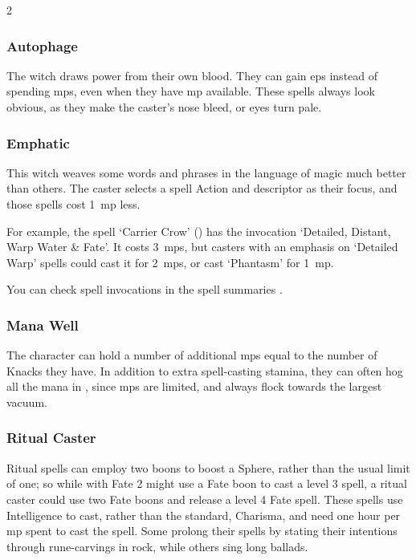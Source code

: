\begin{multicols}{2}

\subsubsection{Autophage}

The \gls{witch} draws power from their own blood.
They can gain \glspl{ep} instead of spending \glspl{mp}, even when they have \gls{mp} available.
These spells always look obvious, as they make the caster's nose bleed, or eyes turn pale.

\subsubsection{Emphatic}
\label{emphaticCaster}

This \gls{witch} weaves some words and phrases in the language of magic much better than others.
The caster selects a spell Action and \gls{descriptor} as their focus, and those spells cost 1~\gls{mp} less.

For example, the spell `Carrier Crow' () has the invocation `Detailed, Distant, Warp Water \& Fate'.
It costs 3~\glspl{mp}, but casters with an emphasis on `Detailed Warp' spells could cast it for 2~\glspl{mp}, or cast `Phantasm' for 1~\gls{mp}.

You can check spell \glspl{invocation} in the spell summaries .

\subsubsection{Mana Well}
\label{manaWell}

The character can hold a number of additional \glspl{mp} equal to the number of Knacks they have.
In addition to extra spell-casting stamina, they can often hog all the mana in , since \glspl{mp} are limited, and always flock towards the largest vacuum.

\subsubsection{Ritual Caster}
\label{ritualCaster}

Ritual spells can employ two \glspl{boon} to boost a Sphere, rather than the usual limit of one; so while  with Fate 2 might use a Fate \gls{boon} to cast a level 3 spell, a ritual caster could use two Fate \glspl{boon} and release a level 4 Fate spell.
These spells use Intelligence to cast, rather than the standard, Charisma, and need one hour per \gls{mp} spent to cast the spell.
Some prolong their spells by stating their intentions through rune-carvings in rock, while others sing long ballads.


\end{multicols}
